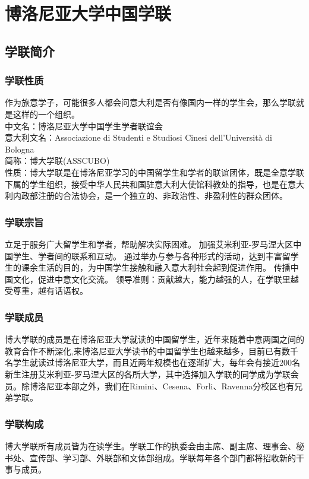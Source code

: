 \chapter{博洛尼亚大学中国学联}              

\section{学联简介}

\subsection{学联性质}
作为旅意学子，可能很多人都会问意大利是否有像国内一样的学生会，那么学联就是这样的一个组织。\\
中文名：博洛尼亚大学中国学生学者联谊会\\
意大利文名：Associazione di Studenti e Studiosi Cinesi dell'Università di Bologna\\
简称：博大学联(ASSCUBO)\\
性质：博大学联是在博洛尼亚学习的中国留学生和学者的联谊团体，既是全意学联下属的学生组织，接受中华人民共和国驻意大利大使馆科教处的指导，也是在意大利内政部注册的合法协会，是一个独立的、非政治性、非盈利性的群众团体。 

\subsection{学联宗旨}
立足于服务广大留学生和学者，帮助解决实际困难。
加强艾米利亚-罗马涅大区中国学生、学者间的联系和互动。 
通过举办与参与各种形式的活动，达到丰富留学生的课余生活的目的，为中国学生接触和融入意大利社会起到促进作用。 
传播中国文化，促进中意文化交流。 领导准则：贡献越大，能力越强的人，在学联里越受尊重，越有话语权。

\subsection{学联成员}
博大学联的成员是在博洛尼亚大学就读的中国留学生，近年来随着中意两国之间的教育合作不断深化,来博洛尼亚大学读书的中国留学生也越来越多，目前已有数千名学生就读过博洛尼亚大学，而且近两年规模也在逐渐扩大，每年会有接近200名新生注册艾米利亚-罗马涅大区的各所大学，其中选择加入学联的同学成为学联会员。除博洛尼亚本部之外，我们在Rimini、Cesena、Forli、Ravenna分校区也有兄弟学联。 

\subsection{学联构成}
博大学联所有成员皆为在读学生。学联工作的执委会由主席、副主席、理事会、秘书处、宣传部、学习部、外联部和文体部组成。学联每年各个部门都将招收新的干事与成员。

